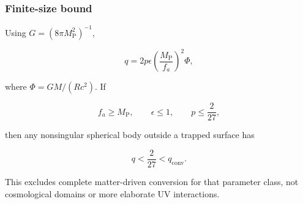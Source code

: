 \documentclass[
]{article}
\begin{document}
\hypertarget{finite-size-bound}{%
\subsubsection{Finite-size bound}\label{finite-size-bound}}

Using \(G=(8\pi M_{\mathrm{P}}^2)^{-1}\),

\[
q=2p\epsilon\left(\frac{M_{\mathrm{P}}}{f_a}\right)^2\Phi,
\]

where \(\Phi=GM/(Rc^2)\). If

\[
f_a\ge M_{\mathrm{P}},
\qquad
\epsilon\le1,
\qquad
p\le\frac{2}{27},
\]

then any nonsingular spherical body outside a trapped surface has

\[
q<\frac{2}{27}<q_{\mathrm{conv}}.
\]

This excludes complete matter-driven conversion for that parameter
class, not cosmological domains or more elaborate UV interactions.
\end{document}

